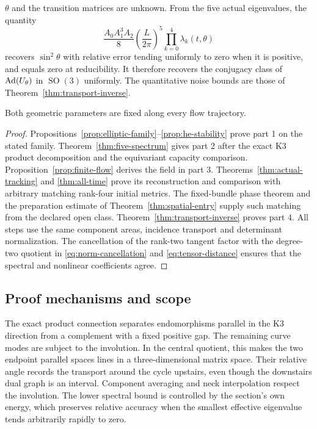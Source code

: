 \begin{theorem}
\begin{enumerate}
$\theta$ and the transition matrices are unknown. From the five
actual eigenvalues, the quantity
\begin{equation}\label{eq:main-inverse}
 \frac{A_0A_1^3A_2}{8}\left(\frac{L}{2\pi}\right)^5
                    \prod_{k=0}^4\lambda_k(t,\theta)
\end{equation}
recovers $\sin^2\theta$ with relative error tending uniformly to
zero when it is positive, and equals zero at reducibility. It
therefore recovers the conjugacy class of $\operatorname{Ad}(U_\theta)$ in
$\operatorname{SO}(3)$ uniformly. The quantitative noise bounds
are those of Theorem~\ref{thm:transport-inverse}.
\end{enumerate}
Both geometric parameters are fixed along every flow trajectory.
\end{theorem}

\begin{proof}
Propositions~\ref{prop:elliptic-family}--\ref{prop:he-stability}
prove part 1 on the stated family. Theorem~\ref{thm:five-spectrum}
gives part 2 after the exact K3 product decomposition and the
equivariant capacity comparison. Proposition~\ref{prop:finite-flow}
derives the field in part 3. Theorems~\ref{thm:actual-tracking}
and \ref{thm:all-time} prove its reconstruction and comparison with
arbitrary matching rank-four initial metrics. The fixed-bundle
phase theorem and the preparation estimate of
Theorem~\ref{thm:spatial-entry} supply such matching from the
declared open class. Theorem~\ref{thm:transport-inverse} proves
part 4. All steps use the same component areas, incidence transport
and determinant normalization. The cancellation of the rank-two
tangent factor with the degree-two quotient in
\eqref{eq:norm-cancellation} and \eqref{eq:tensor-distance}
ensures that the spectral and nonlinear coefficients agree.
\end{proof}

\subsection{Proof mechanisms and scope}
The exact product connection separates endomorphisms parallel in the
K3 direction from a complement with a fixed positive gap. The
remaining curve modes are subject to the involution. In the central
quotient, this makes the two endpoint parallel spaces lines in a
three-dimensional matrix space. Their relative angle records the
transport around the cycle upstairs, even though the downstairs
dual graph is an interval. Component averaging and neck interpolation
respect the involution. The lower spectral bound is controlled by
the section's own energy, which preserves relative accuracy when
the smallest effective eigenvalue tends arbitrarily rapidly to zero.

